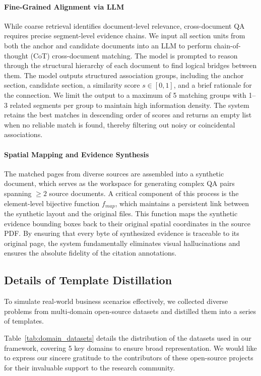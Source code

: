 \documentclass{llmxive}
\begin{document}
{{{\paragraph{Fine-Grained Alignment via LLM}
While coarse retrieval identifies document-level relevance, cross-document QA requires precise segment-level evidence chains. We input all section units from both the anchor and candidate documents into an LLM to perform chain-of-thought (CoT) cross-document matching. The model is prompted to reason through the structural hierarchy of each document to find logical bridges between them. The model outputs structured association groups, including the anchor section, candidate section, a similarity score $s \in [0,1]$, and a brief rationale for the connection. We limit the output to a maximum of 5 matching groups with 1--3 related segments per group to maintain high information density. The system retains the best matches in descending order of scores and returns an empty list when no reliable match is found, thereby filtering out noisy or coincidental associations.

\paragraph{Spatial Mapping and Evidence Synthesis}
The matched pages from diverse sources are assembled into a synthetic document, which serves as the workspace for generating complex QA pairs spanning $\ge 2$ source documents. A critical component of this process is the element-level bijective function $f_{map}$, which maintains a persistent link between the synthetic layout and the original files. This function maps the synthetic evidence bounding boxes back to their original spatial coordinates in the source PDF. By ensuring that every byte of synthesized evidence is traceable to its original page, the system fundamentally eliminates visual hallucinations and ensures the absolute fidelity of the citation annotations.

\subsection{Details of Template Distillation}
\label{Appendix: Details of QA Construction}

To simulate real-world business scenarios effectively, we collected diverse problems from multi-domain open-source datasets and distilled them into a series of templates.

Table~\ref{tab:domain_datasets} details the distribution of the datasets used in our framework, covering 5 key domains to ensure broad representation. We would like to express our sincere gratitude to the contributors of these open-source projects for their invaluable support to the research community.

}}}
\end{document}
